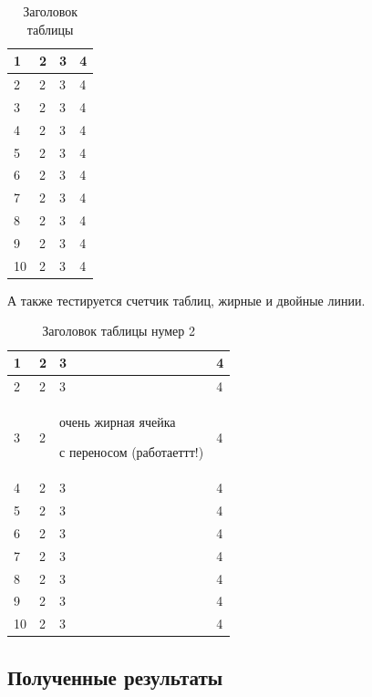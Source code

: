 \documentclass[a4paper,article,14pt]{extarticle}
\begin{document}
\begin{center}
    \begin{longtable}{|p{2cm}|p{3cm}|p{7cm}|p{3cm}|}
    \caption{Заголовок таблицы}\\
    \hline
    1 & 2 & 3 & 4\\ 
    \hline 
    2 & 2 & 3 & 4\\
    \hline
    3 & 2 & 3 & 4\\
    \hline
    4 & 2 & 3 & 4\\
    \hline
    5 & 2 & 3 & 4\\
    \hline
    6 & 2 & 3 & 4\\
    \hline
    7 & 2 & 3 & 4\\
    \hline
    8 & 2 & 3 & 4\\
    \hline
    9 & 2 & 3 & 4\\
    \hline
    10 & 2 & 3 & 4\\
    \hline
    
    
    \end{longtable}
\end{center}


А также тестируется счетчик таблиц, жирные и двойные линии.

\begin{center}
    \begin{longtable}{|p{2cm}||p{3cm}|p{7cm}|p{3cm}|}
    \caption{Заголовок таблицы нумер 2}\\
    \hline
    1 & 2 & 3 & 4\\ 
    \hline
    2 & 2 & 3 & 4\\
    \hline
    3 & 2 & очень жирная ячейка \par с переносом (работаеттт!) & 4\\
    \hline
    4 & 2 & 3 & 4\\
    \hline
    5 & 2 & 3 & 4\\
    \hline
    6 & 2 & 3 & 4\\
    \hline
    7 & 2 & 3 & 4\\
    \hline
    8 & 2 & 3 & 4\\
    \hline
    9 & 2 & 3 & 4\\
    \hline
    10 & 2 & 3 & 4\\
    \hline
    
    
    \end{longtable}
\end{center}


\subsection{Полученные результаты} 
\end{document}
